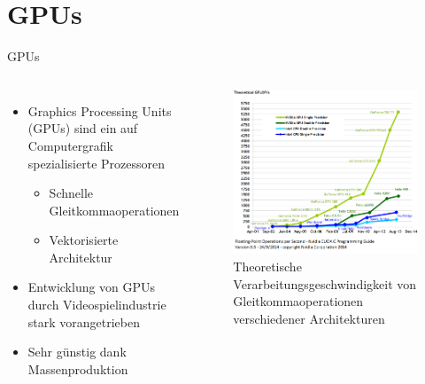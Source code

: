 \documentclass[10pt]{beamer}
\begin{document}
\section{GPUs}

\begin{frame}{GPUs}
  \begin{columns}
      \begin{itemize}
        \item Graphics Processing Units (GPUs) sind ein auf Computergrafik
              spezialisierte Prozessoren
        \begin{itemize}
          \item Schnelle Gleitkommaoperationen
          \item Vektorisierte Architektur
        \end{itemize}
        \item Entwicklung von GPUs durch Videospielindustrie stark
              vorangetrieben
        \item Sehr günstig dank Massenproduktion
      \end{itemize}
      \begin{figure}
        \centering
        \includegraphics[width=\linewidth]{figures/fg-flops.png}
        \caption{Theoretische Verarbeitungsgeschwindigkeit von
                 Gleitkommaoperationen verschiedener
                 Architekturen\footnotemark[1]}
      \end{figure}
  \end{columns}

\end{frame}
\end{document}
